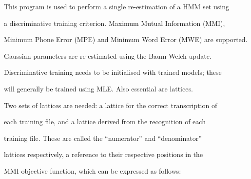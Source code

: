 

%







%





\newpage

















This program is used to perform a single re-estimation of a HMM set using


a discriminative training criterion.  Maximum Mutual Information (MMI),


Minimum Phone Error (MPE) and  Minimum Word Error (MWE) are supported.


Gaussian parameters are re-estimated using the Baum-Welch update.  





Discriminative training needs to be initialised with trained models; these


will generally be trained using MLE.  Also essential are lattices.


Two sets of lattices are needed: a lattice for the correct transcription of


each training file, and a lattice derived from the recognition of each


training file.  These are called the ``numerator'' and ``denominator''


lattices respectively, a reference to their respective positions in the


MMI objective function, which can be expressed as follows:





\newcommand{\num}{{\mathrm{num}}}


\newcommand{\den}{{\mathrm{den}}}


\newcommand{\MMI}{{\mathrm{MMI}}}


